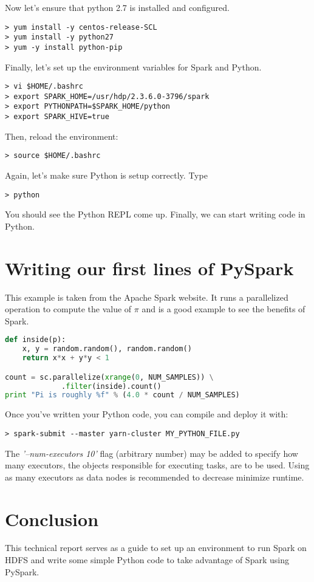 \documentclass[9pt,twocolumn,twoside]{idsi}
\begin{document}
Now let's ensure that python 2.7 is installed and configured.
\begin{verbatim}
> yum install -y centos-release-SCL
> yum install -y python27
> yum -y install python-pip
\end{verbatim}

\noindent
Finally, let's set up the environment variables for Spark and Python.
\begin{verbatim}
> vi $HOME/.bashrc
> export SPARK_HOME=/usr/hdp/2.3.6.0-3796/spark
> export PYTHONPATH=$SPARK_HOME/python
> export SPARK_HIVE=true
\end{verbatim}

\noindent
Then, reload the environment:
\begin{verbatim}
> source $HOME/.bashrc
\end{verbatim}

Again, let's make sure Python is setup correctly. Type
\begin{verbatim}
> python
\end{verbatim}
You should see the Python REPL come up. Finally, we can start writing code in Python.

\section{Writing our first lines of PySpark}

This example is taken from the Apache Spark website. It runs a parallelized operation to compute the value of $\pi$ and is a good example to see the benefits of Spark.
\begin{lstlisting}[language=python]
def inside(p):
    x, y = random.random(), random.random()
    return x*x + y*y < 1

count = sc.parallelize(xrange(0, NUM_SAMPLES)) \
             .filter(inside).count()
print "Pi is roughly %f" % (4.0 * count / NUM_SAMPLES)
\end{lstlisting}

Once you've written your Python code, you can compile and deploy it with:
\begin{verbatim}
> spark-submit --master yarn-cluster MY_PYTHON_FILE.py
\end{verbatim}

\noindent
The \textit{'--num-executors 10'} flag (arbitrary number) may be added to specify how many executors, the objects responsible for executing tasks, are to be used. Using as many executors as data nodes is recommended to decrease minimize runtime.

\section{Conclusion}

This technical report serves as a guide to set up an environment to run Spark on HDFS and write some simple Python code to take advantage of Spark using PySpark.
\end{document}

